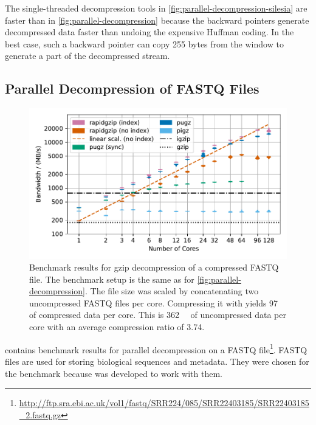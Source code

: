 The single-threaded decompression tools in \cref{fig:parallel-decompression-silesia} are faster than in \cref{fig:parallel-decompression} because the backward pointers generate decompressed data faster than undoing the expensive Huffman coding.
In the best case, such a backward pointer can copy 255 bytes from the window to generate a part of the decompressed stream.


\subsection{Parallel Decompression of FASTQ Files}

\begin{figure}
    \centering
    \includegraphics[width=\linewidth]{plots/result-parallel-decompression-fastq-dev-null-bandwidths-number-of-threads.pdf}
    \caption{
        Benchmark results for gzip decompression of a compressed FASTQ file.
        The benchmark setup is the same as for \cref{fig:parallel-decompression}.
        The file size was scaled by concatenating two uncompressed FASTQ files per core.
        Compressing it with \pigz yields \SI{97}{\mega\byte} of compressed data per core.
        This is \SI{362}{\mega\byte} of uncompressed data per core with an average compression ratio of \num{3.74}.
    }
    \label{fig:parallel-decompression-fastq}
\end{figure}

 contains benchmark results for parallel decompression on a FASTQ file\footnote{        \url{http://ftp.sra.ebi.ac.uk/vol1/fastq/SRR224/085/SRR22403185/SRR22403185_2.fastq.gz}}.
FASTQ files are used for storing biological sequences and metadata.
They were chosen for the benchmark because \pugz was developed to work with them.

